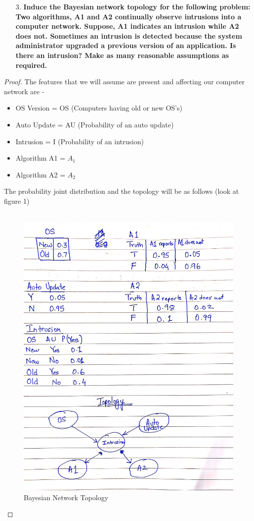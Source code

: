 \documentclass{article}
\theoremstyle{case}
\begin{document}
\begin{enumerate}
    \item [3.] \textbf{Induce the Bayesian network topology for the following problem: Two
algorithms, A1 and A2 continually observe intrusions into a computer
network. Suppose, A1 indicates an intrusion while A2 does not. Sometimes
an intrusion is detected because the system administrator upgraded a
previous version of an application. Is there an intrusion? Make as many
reasonable assumptions as required.}
\end{enumerate} 
\begin{proof} 
The features that we will assume are present and affecting our computer network are - 
\begin{itemize}
  \item OS Version = OS (Computers having old or new OS's)
  \item Auto Update = AU (Probability of an auto update)
  \item Intrusion = I (Probability of an intrusion)
  \item Algorithm A1 =  $A_1$
  \item Algorithm A2 = $A_2$
\end{itemize}
The probability joint distribution and the topology will be as follows (look at figure 1) \\ \\
\begin{figure}[h]
            \caption{Bayesian Network Topology}
            \includegraphics[scale=0.2]{img3.jpg}

\end{figure}
\end{proof}
\end{document}
